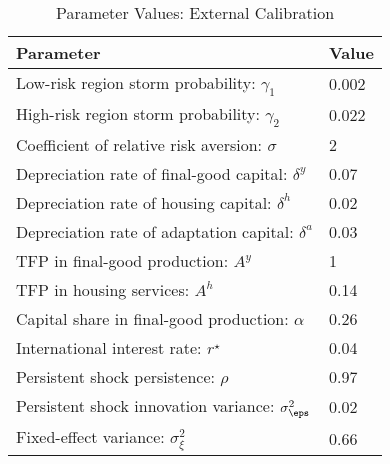 \begin{table}[H] 
\singlespace 
\center 
\caption{Parameter Values: External Calibration} \label{tab:params_direct}
\vspace{-.1in} 
\begin{tabular}{l l}\hline 
\hline 
 Parameter & Value  \\ 
 \hline 
 Low-risk region storm probability: $\gamma_1$ &     0.002   \\  High-risk region storm probability: $\gamma_2$ &     0.022  \\  Coefficient of relative risk aversion: $\sigma$ &         2    \\  Depreciation rate of final-good capital: $\delta^y$ &      0.07    \\  Depreciation rate of housing capital: $\delta^h$ &      0.02   \\  Depreciation rate of adaptation capital: $\delta^a$ &      0.03    \\  TFP in final-good production: $A^y$ &         1  \\  TFP in housing services: $A^h$ &      0.14 \\  Capital share in final-good production: $\alpha$ &      0.26   \\ International interest rate: $r^\star$ &      0.04 \\ Persistent shock persistence: $\rho$ &      0.97  \\ Persistent shock innovation variance: $\sigma_{\eps}^2$ &      0.02   \\ Fixed-effect variance: $\sigma_{\xi}^2$ &      0.66    \\ \hline 
\end{tabular}
\end{table} 
